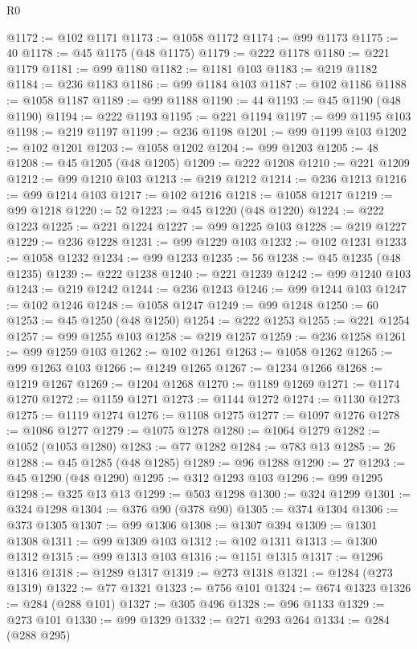\begin{lexlean}{R0}
\begin{coremodule}
@1172 := @102 @1171
@1173 := @1058 @1172
@1174 := @99 @1173
@1175 := 40
@1178 := @45 @1175 (@48 @1175)
@1179 := @222 @1178
@1180 := @221 @1179
@1181 := @99 @1180
@1182 := @1181 @103
@1183 := @219 @1182
@1184 := @236 @1183
@1186 := @99 @1184 @103
@1187 := @102 @1186
@1188 := @1058 @1187
@1189 := @99 @1188
@1190 := 44
@1193 := @45 @1190 (@48 @1190)
@1194 := @222 @1193
@1195 := @221 @1194
@1197 := @99 @1195 @103
@1198 := @219 @1197
@1199 := @236 @1198
@1201 := @99 @1199 @103
@1202 := @102 @1201
@1203 := @1058 @1202
@1204 := @99 @1203
@1205 := 48
@1208 := @45 @1205 (@48 @1205)
@1209 := @222 @1208
@1210 := @221 @1209
@1212 := @99 @1210 @103
@1213 := @219 @1212
@1214 := @236 @1213
@1216 := @99 @1214 @103
@1217 := @102 @1216
@1218 := @1058 @1217
@1219 := @99 @1218
@1220 := 52
@1223 := @45 @1220 (@48 @1220)
@1224 := @222 @1223
@1225 := @221 @1224
@1227 := @99 @1225 @103
@1228 := @219 @1227
@1229 := @236 @1228
@1231 := @99 @1229 @103
@1232 := @102 @1231
@1233 := @1058 @1232
@1234 := @99 @1233
@1235 := 56
@1238 := @45 @1235 (@48 @1235)
@1239 := @222 @1238
@1240 := @221 @1239
@1242 := @99 @1240 @103
@1243 := @219 @1242
@1244 := @236 @1243
@1246 := @99 @1244 @103
@1247 := @102 @1246
@1248 := @1058 @1247
@1249 := @99 @1248
@1250 := 60
@1253 := @45 @1250 (@48 @1250)
@1254 := @222 @1253
@1255 := @221 @1254
@1257 := @99 @1255 @103
@1258 := @219 @1257
@1259 := @236 @1258
@1261 := @99 @1259 @103
@1262 := @102 @1261
@1263 := @1058 @1262
@1265 := @99 @1263 @103
@1266 := @1249 @1265
@1267 := @1234 @1266
@1268 := @1219 @1267
@1269 := @1204 @1268
@1270 := @1189 @1269
@1271 := @1174 @1270
@1272 := @1159 @1271
@1273 := @1144 @1272
@1274 := @1130 @1273
@1275 := @1119 @1274
@1276 := @1108 @1275
@1277 := @1097 @1276
@1278 := @1086 @1277
@1279 := @1075 @1278
@1280 := @1064 @1279
@1282 := @1052 (@1053 @1280)
@1283 := @77 @1282
@1284 := @783 @13
@1285 := 26
@1288 := @45 @1285 (@48 @1285)
@1289 := @96 @1288
@1290 := 27
@1293 := @45 @1290 (@48 @1290)
@1295 := @312 @1293 @103
@1296 := @99 @1295
@1298 := @325 @13 @13
@1299 := @503 @1298
@1300 := @324 @1299
@1301 := @324 @1298
@1304 := @376 @90 (@378 @90)
@1305 := @374 @1304
@1306 := @373 @1305
@1307 := @99 @1306
@1308 := @1307 @394
@1309 := @1301 @1308
@1311 := @99 @1309 @103
@1312 := @102 @1311
@1313 := @1300 @1312
@1315 := @99 @1313 @103
@1316 := @1151 @1315
@1317 := @1296 @1316
@1318 := @1289 @1317
@1319 := @273 @1318
@1321 := @1284 (@273 @1319)
@1322 := @77 @1321
@1323 := @756 @101
@1324 := @674 @1323
@1326 := @284 (@288 @101)
@1327 := @305 @496
@1328 := @96 @1133
@1329 := @273 @101
@1330 := @99 @1329
@1332 := @271 @293 @264
@1334 := @284 (@288 @295)

\end{coremodule}
\end{lexlean}
